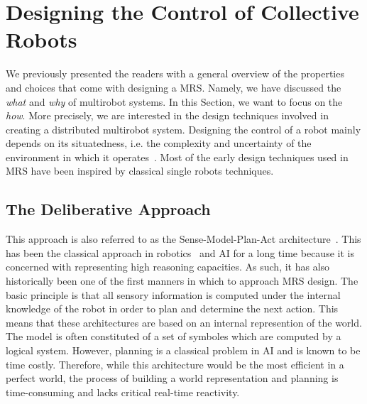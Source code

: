 

\section{Designing the Control of Collective Robots}

  We previously presented the readers with a general overview of the properties and choices that come with designing a MRS. Namely, we have discussed the \emph{what} and \emph{why} of multirobot systems. In this Section, we want to focus on the \emph{how}. More precisely, we are interested in the design techniques involved in creating a distributed multirobot system. Designing the control of a robot mainly depends on its situatedness, i.e. the complexity and uncertainty of the environment in which it operates~\parencite{Mataric2008}. Most of the early design techniques used in MRS have been inspired by classical single robots techniques.

  \subsection{The Deliberative Approach}

    This approach is also referred to as the Sense-Model-Plan-Act architecture~\parencite{Albus1991, Iocchi2001, Mataric2008}. This has been the classical approach in robotics~\parencite{Nilsson1984} and AI for a long time because it is concerned with representing high reasoning capacities. As such, it has also historically been one of the first manners in which to approach MRS design. The basic principle is that all sensory information is computed under the internal knowledge of the robot in order to plan and determine the next action. This means that these architectures are based on an internal represention of the world. The model is often constituted of a set of symboles which are computed by a logical system. However, planning is a classical problem in AI and is known to be time costly. Therefore, while this architecture would be the most efficient in a perfect world, the process of building a world representation and planning is time-consuming and lacks critical real-time reactivity.


